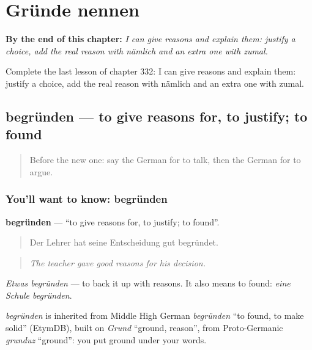 
\chapter{Gründe nennen}
\label{ch:ge-grunde-nennen}

\begin{chapteropening}
\textbf{By the end of this chapter:} \emph{I can give reasons and explain them: justify a choice, add the real reason with nämlich and an extra one with zumal.}

Complete the last lesson of chapter 332: I can give reasons and explain them: justify a choice, add the real reason with nämlich and an extra one with zumal.
\end{chapteropening}

\section[begründen]{begründen — to give reasons for, to justify; to found}

\label{lesson:GE-C332-begruenden}



\begin{quote}
Before the new one: say the German for to talk, then the German for to argue.
\end{quote}

\subsection*{You'll want to know: begründen}
\textbf{begründen} — \textquotedblleft{}to give reasons for, to justify; to found\textquotedblright{}.

\begin{quote}
Der Lehrer hat seine Entscheidung gut begründet.
\end{quote}

\begin{quote}
\emph{The teacher gave good reasons for his decision.}
\end{quote}

\emph{Etwas begründen} — to back it up with reasons. It also means to found: \emph{eine Schule begründen}.

\begin{cousinweb}
\emph{begründen} is inherited from Middle High German \emph{begründen} \textquotedblleft{}to found, to make solid\textquotedblright{} (EtymDB), built on \emph{Grund} \textquotedblleft{}ground, reason\textquotedblright{}, from Proto-Germanic \emph{grunduz} \textquotedblleft{}ground\textquotedblright{}: you put ground under your words.
\end{cousinweb}


